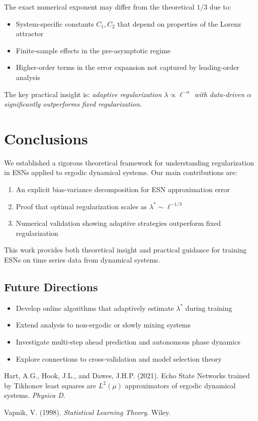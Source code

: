 \documentclass[11pt]{article}
\theoremstyle{definition}
\theoremstyle{remark}
\begin{document}
The exact numerical exponent may differ from the theoretical $1/3$ due to:
\begin{itemize}
\item System-specific constants $C_1, C_2$ that depend on properties of the Lorenz attractor
\item Finite-sample effects in the pre-asymptotic regime
\item Higher-order terms in the error expansion not captured by leading-order analysis
\end{itemize}

The key practical insight is: \textit{adaptive regularization $\lambda \propto \ell^{-\alpha}$ with data-driven $\alpha$ significantly outperforms fixed regularization}.

\section{Conclusions}

We established a rigorous theoretical framework for understanding regularization in ESNs applied to ergodic dynamical systems. Our main contributions are:

\begin{enumerate}
\item An explicit bias-variance decomposition for ESN approximation error
\item Proof that optimal regularization scales as $\lambda^* \sim \ell^{-1/3}$
\item Numerical validation showing adaptive strategies outperform fixed regularization
\end{enumerate}

This work provides both theoretical insight and practical guidance for training ESNs on time series data from dynamical systems.

\subsection{Future Directions}

\begin{itemize}
\item Develop online algorithms that adaptively estimate $\lambda^*$ during training
\item Extend analysis to non-ergodic or slowly mixing systems
\item Investigate multi-step ahead prediction and autonomous phase dynamics
\item Explore connections to cross-validation and model selection theory
\end{itemize}

\begin{thebibliography}{99}

Hart, A.G., Hook, J.L., and Dawes, J.H.P. (2021).
Echo State Networks trained by Tikhonov least squares are $L^2(\mu)$ approximators of ergodic dynamical systems.
\textit{Physica D}.

Vapnik, V. (1998).
\textit{Statistical Learning Theory}.
Wiley.

\end{thebibliography}
\end{document}
